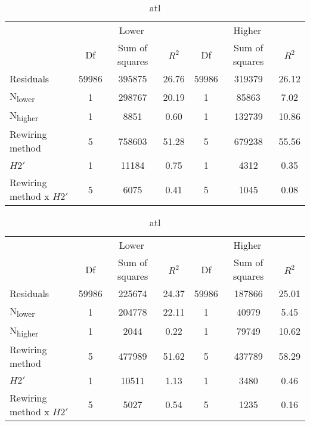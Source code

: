\documentclass[12pt,a4paper]{article}
\begin{document}

\begin{table}
\ContinuedFloat
    \begin{subtable}{\linewidth}
    \caption{atL}
    \centering
\begin{tabularx}{\linewidth}{@{} X *6{c} @{}}
\toprule
  & \multicolumn{3}{c}{Lower} & \multicolumn{3}{c}{Higher} \\ \cmidrule(l){2-4} \cmidrule(l){5-7}
  						& Df		& Sum of squares	& $R^2$	& Df 	& Sum of squares	& $R^2$ \\ \midrule
Residuals 				& 59986 & 395875		& 26.76	& 59986 & 319379 		& 26.12   \\
N\textsubscript{lower} 	& 1 		& 298767 		& 20.19 	& 1		& 85863 		& 7.02  \\
N\textsubscript{higher} 	& 1 		& 8851 			& 0.60	& 1 		& 132739			& 10.86  \\
Rewiring method 			& 5 		& 758603			& 51.28 	& 5 		& 679238			& 55.56  \\
$H2'$ 					& 1 		& 11184 			& 0.75 	& 1 		& 4312			& 0.35 \\
Rewiring method x $H2'$ 	& 5 		& 6075 			& 0.41 	& 5 		& 1045			& 0.08  \\ \bottomrule
\end{tabularx}
\end{subtable}

\medskip
    \begin{subtable}{\linewidth}
    \caption{atl}
    \centering
\begin{tabularx}{\linewidth}{@{} X *6{c} @{}}
\toprule
  & \multicolumn{3}{c}{Lower} & \multicolumn{3}{c}{Higher} \\ \cmidrule(l){2-4} \cmidrule(l){5-7}
  						& Df		& Sum of squares	& $R^2$	& Df 	& Sum of squares	& $R^2$ \\ \midrule
Residuals 				& 59986 & 225674			& 24.37	& 59986 & 187866		& 25.01   \\
N\textsubscript{lower} 	& 1 		& 204778 			& 22.11 	& 1		& 40979			& 5.45  \\
N\textsubscript{higher} 	& 1 		& 2044 			& 0.22	& 1 		& 79749 		& 10.62  \\
Rewiring method 			& 5 		& 477989 		& 51.62 	& 5 		& 437789			& 58.29  \\
$H2'$ 					& 1 		& 10511 			& 1.13 	& 1 		& 3480			& 0.46 \\
Rewiring method x $H2'$ 	& 5 		& 5027 			& 0.54 	& 5 		& 1235			&  0.16  \\ \bottomrule
\end{tabularx}
\end{subtable}


\end{table}
\end{document}
